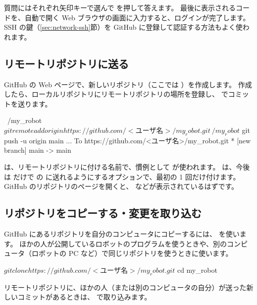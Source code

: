 質問にはそれぞれ矢印キーで選んで  を押して答えます。
最後に表示されるコードを、自動で開く Web ブラウザの画面に入力すると、ログインが完了します。
SSH の鍵（\ref{sec:network-ssh}節）を GitHub に登録して認証する方法もよく使われます。

\subsection{リモートリポジトリに送る}

GitHub の Web ページで、新しいリポジトリ（ここでは ）を作成します。
作成したら、ローカルリポジトリにリモートリポジトリの場所を登録し、 でコミットを送ります。

\begin{terminal}
~/my_robot$ git remote add origin https://github.com/<ユーザ名>/my_robot.git
~/my_robot$ git push -u origin main
...
To https://github.com/<ユーザ名>/my_robot.git
 * [new branch]      main -> main
\end{terminal}

 は、リモートリポジトリに付ける名前で、慣例として  が使われます。
 は、今後は  だけで  の  に送れるようにするオプションで、最初の 1 回だけ付けます。
GitHub のリポジトリのページを開くと、 などが表示されているはずです。

\subsection{リポジトリをコピーする・変更を取り込む}

GitHub にあるリポジトリを自分のコンピュータにコピーするには、 を使います。
ほかの人が公開しているロボットのプログラムを使うときや、別のコンピュータ（ロボットの PC など）で同じリポジトリを使うときに使います。

\begin{termexample}[リポジトリをコピーする]
$ git clone https://github.com/<ユーザ名>/my_robot.git
$ cd my_robot
\end{termexample}

リモートリポジトリに、ほかの人（または別のコンピュータの自分）が送った新しいコミットがあるときは、 で取り込みます。


